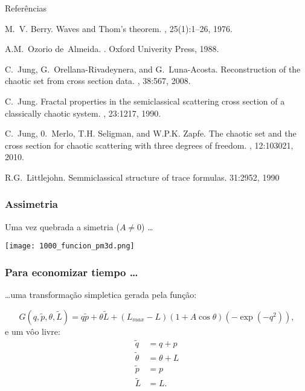 \documentclass{beamer}
\begin{document}
\begin{frame}[allowframebreaks]{Referências} 

\begin{thebibliography}{9}

M.~V. Berry.
\newblock Waves and Thom's theorem.
, 25(1):1--26, 1976.

A.M.~Ozorio de~Almeida.
.
\newblock Oxford Univerity Press, 1988.


C.~Jung, G.~Orellana-Rivadeynera, and G.~Luna-Acosta.
\newblock Reconstruction of the chaotic set from cross section data.
, 38:567, 2008.

C.~Jung.
\newblock Fractal properties in the semiclassical scattering cross section of a
  classically chaotic system.
, 23:1217, 1990.

C.~Jung, 0.~Merlo, T.H. Seligman, and W.P.K. Zapfe.
\newblock The chaotic set and the cross section for chaotic scattering with
  three degrees of freedom.
, 12:103021, 2010.

  R.G.~Littlejohn.
 \newblock Semmiclassical structure of trace formulas.
  31:2952, 1990 

\end{thebibliography}
\end{frame}



\begin{frame}
  \frametitle{Assimetria}
  Uma vez quebrada a simetria ($A\neq 0$) \ldots
    \begin{center}
  \texttt{[image: 1000\_funcion\_pm3d.png]}
  \end{center}
\end{frame}


\begin{frame}
  \frametitle{Para economizar tiempo \ldots}
  \ldots uma transformação simpletica gerada pela função:
  
  \begin{equation}
    G(q,\tilde{p},\theta,\tilde{L})=
    q\tilde{p}+\theta\tilde{L}+(L_{max}-L)(1+A \cos\theta)(-\exp(-q^2)),
  \end{equation}  
    e um vôo livre:
\begin{align}
 \tilde{q} &= q + p \\
 \tilde{\theta} &= \theta + L \\
 \tilde{p} &= p \\
 \tilde{L} &=  L.
\end{align}
  
\end{frame}
\end{document}
